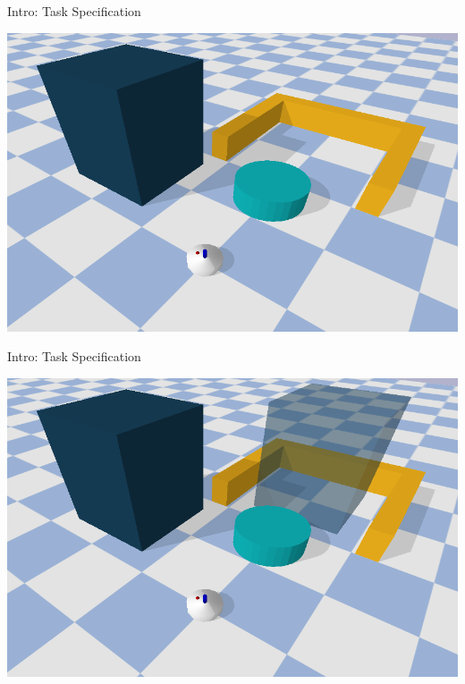\begin{frame}[fragile]{Intro: Task Specification}
\begin{center}
\includegraphics[width=1.0\textwidth]{figures/introduction/blockade}
\end{center}
\end{frame}

\begin{frame}[fragile]{Intro: Task Specification}
\begin{center}
\includegraphics[width=1.0\textwidth]{figures/introduction/blockade_with_target}
\end{center}
\end{frame}


